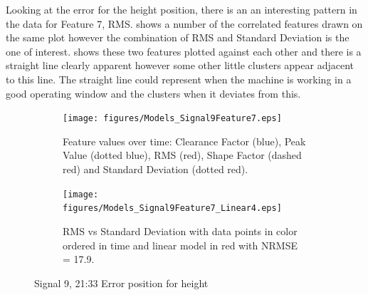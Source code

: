 \documentclass[]{article}
\begin{document}
Looking at the error for the height position, there is an an interesting pattern in the data for Feature 7, \gls{RMS}.  shows a number of the correlated features drawn on the same plot however the combination of \gls{RMS} and Standard Deviation is the one of interest.  shows these two features plotted against each other and there is a straight line clearly apparent however some other little clusters appear adjacent to this line. The straight line could represent when the machine is working in a good operating window and the clusters when it deviates from this.
\begin{figure}[H]
    \centering
		\begin{subfigure}[t]{.45\textwidth}
		  	\centering
    			\texttt{[image: figures/Models\_Signal9Feature7.eps]}
		  	\caption{Feature values over time: Clearance Factor (blue), Peak Value (dotted blue), RMS (red), Shape Factor (dashed red) and Standard Deviation (dotted red).}
		  	\label{fig:Models_Signal9Feature7}
		\end{subfigure}\hspace{\fill}%
		\begin{subfigure}[t]{.45\textwidth}
		  	\centering
 		   	\texttt{[image: figures/Models\_Signal9Feature7\_Linear4.eps]}
		  	\caption{RMS vs Standard Deviation with data points in color ordered in time and linear model in red with \gls{NRMSE} = 17.9.}
		  	\label{fig:Models_Signal9Feature7_Linear4}
		\end{subfigure}
    \caption{Signal 9, 21:33 Error position for height}
    \label{fig:Models_Signal9Feature7_Caption}
\end{figure}
\end{document}
